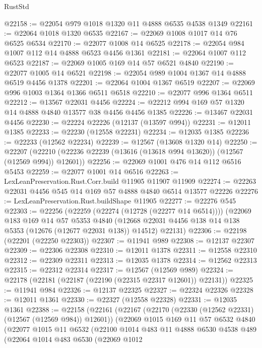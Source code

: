 \begin{lexlean}{RustStd}
\begin{coremodule}
@22158 := @22054 @979 @1018 @1320 @11 @4888 @6535 @4538 @1349
@22161 := @22064 @1018 @1320 @6535
@22167 := @22069 @1008 @1017 @14 @76 @6525 @6534
@22170 := @22077 @1008 @14 @6525
@22178 := @22054 @984 @1007 @112 @14 @4888 @6523 @4456 @1361
@22181 := @22064 @1007 @112 @6523
@22187 := @22069 @1005 @169 @14 @57 @6521 @4840
@22190 := @22077 @1005 @14 @6521
@22198 := @22054 @989 @1004 @1367 @14 @4888 @6519 @4456 @1378
@22201 := @22064 @1004 @1367 @6519
@22207 := @22069 @996 @1003 @1364 @1366 @6511 @6518
@22210 := @22077 @996 @1364 @6511
@22212 := @13567 @22031 @4456
@22224 := @22212 @994 @169 @57 @1320 @14 @4888 @4840 @13577 @38 @4456 @4456 @1385
@22226 := @13467 @22031 @4456
@22230 := @22224 @22226 (@12137 (@13597 @994))
@22231 := @12011 @1385
@22233 := @22230 (@12558 @22231)
@22234 := @12035 @1385
@22236 := @22233 (@12562 @22234)
@22239 := @12567 (@13608 @1320 @14)
@22250 := @22207
    (@22210 (@22236 @22239 (@13616 (@13618 @994 @13620)) (@12567 (@12569 @994)) @12601))
@22256 := @22069 @1001 @476 @14 @112 @6516 @5453
@22259 := @22077 @1001 @14 @6516
@22263 := LexLeanPreservation.Rust.Corr.build @11905 @11907 @11909
@22274 := @22263 @22031 @4456 @545 @14 @169 @57 @4888 @4840 @6514 @13577 @22226
@22276 := LexLeanPreservation.Rust.buildShape @11905
@22277 := @22276 @545
@22303 := @22256
    (@22259 (@22274 (@12728 (@22277 @14 @6514))))
    (@22069
      @183
      @169
      @14
      @57
      @5353
      @4840
      (@12668 @22031 @4456 @138 @14 @138 @5353 (@12676 (@12677 @22031 @138)) @14512)
      @22131)
@22306 := @22198 (@22201 (@22250 @22303))
@22307 := @11941 @989
@22308 := @12137 @22307
@22309 := @22306 @22308
@22310 := @12011 @1378
@22311 := @12558 @22310
@22312 := @22309 @22311
@22313 := @12035 @1378
@22314 := @12562 @22313
@22315 := @22312 @22314
@22317 := @12567 (@12569 @989)
@22324 := @22178 (@22181 (@22187 (@22190 (@22315 @22317 @12601)) @22131))
@22325 := @11941 @984
@22326 := @12137 @22325
@22327 := @22324 @22326
@22328 := @12011 @1361
@22330 := @22327 (@12558 @22328)
@22331 := @12035 @1361
@22388 := @22158
    (@22161
      (@22167
        (@22170 (@22330 (@12562 @22331) (@12567 (@12569 @984)) @12601))
        (@22069
          @1015
          @169
          @11
          @57
          @6532
          @4840
          (@22077
            @1015
            @11
            @6532
            (@22100
              @1014
              @483
              @11
              @4888
              @6530
              @4538
              @489
              (@22064
                @1014
                @483
                @6530
                (@22069
                  @1012

\end{coremodule}
\end{lexlean}
